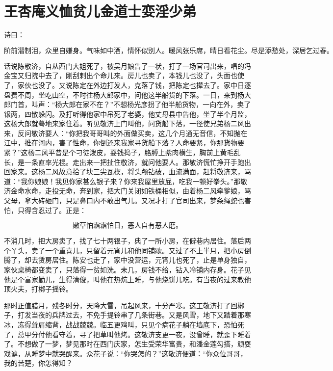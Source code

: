 

\chapter{王杏庵义恤贫儿\KG 金道士娈淫少弟}


诗曰：

\[
阶前潜制泪，众里自嫌身。气味如中酒，情怀似别人。
暖风张乐席，晴日看花尘。尽是添愁处，深居乞过春。
\]

话说陈敬济，自从西门大姐死了，被吴月娘告了一状，打了一场官司出来，唱的冯金宝又归院中去了，刚刮剌出个命儿来。房儿也卖了，本钱儿也没了，头面也使了，家伙也没了。又说陈定在外边打发人，克落了钱，把陈定也撵去了。家中日逐盘费不周，坐吃山空，不时往杨大郎家中，问他这半船货的下落。一日，来到杨大郎门首，叫声：“杨大郎在家不在？”不想杨光彦拐了他半船货物，一向在外，卖了银两，四散躲闪。及打听得他家中吊死了老婆，他丈母县中告他，坐了半个月监，这杨大郎就蓦地来家住着。听见敬济上门叫他，问货船下落，一径使兄弟杨二风出来，反问敬济要人：“你把我哥哥叫的外面做买卖，这几个月通无音信，不知抛在江中，推在河内，害了性命，你倒还来我家寻货船下落？人命要紧，你那货物要紧？”这杨二风平昔是个刁徒泼皮，耍钱捣子，胳膊上紫肉横生，胸前上黄毛乱长，是一条直率光棍。走出来一把扯住敬济，就问他要人。那敬济慌忙挣开手跑出回家来。这杨二风故意拾了块三尖瓦楔，将头颅钻破，血流满面，赶将敬济来，骂道：“我你娘娘！我见你家甚么银子来？你来我屋里放屁，吃我一顿好拳头。”那敬济金命水命，走投无命，奔到家，把大门关闭如铁桶相似，由着杨二风牵爹娘，骂父母，拿大砖砸门，只是鼻口内不敢出气儿。又况才打了官司出来，梦条绳蛇也害怕，只得含忍过了。正是：

\[
嫩草怕霜霜怕日，恶人自有恶人磨。
\]

不消几时，把大房卖了，找了七十两银子，典了一所小房，在僻巷内居住。落后两个丫头，卖了一个重喜儿，只留着元宵儿和他同铺歇。又过了不上半月，把小房倒腾了，却去赁房居住。陈安也走了，家中没营运，元宵儿也死了，止是单身独自，家伙桌椅都变卖了，只落得一贫如洗。未几，房钱不给，钻入冷铺内存身。花子见他是个富家勤儿，生得清俊，叫他在热炕上睡，与他烧饼儿吃。有当夜的过来教他顶火夫，打梆子摇铃。

那时正值腊月，残冬时分，天降大雪，吊起风来，十分严寒。这工敬济打了回梆子，打发当夜的兵牌过去，不免手提铃串了几条街巷。又是风雪，地下又踏着那寒冰，冻得耸肩缩背，战战兢兢。临五更鸡叫，只见个病花子躺在墙底下，恐怕死了，总甲分付他看守着，寻了把草叫他烤。这敬济支更一夜，没曾睡，就歪下睡着了。不想做了一梦，梦见那时在西门庆家，怎生受荣华富贵，和潘金莲勾搭，顽耍戏谑，从睡梦中就哭醒来。众花子说：“你哭怎的？”这敬济便道：“你众位哥哥，我的苦楚，你怎得知？

